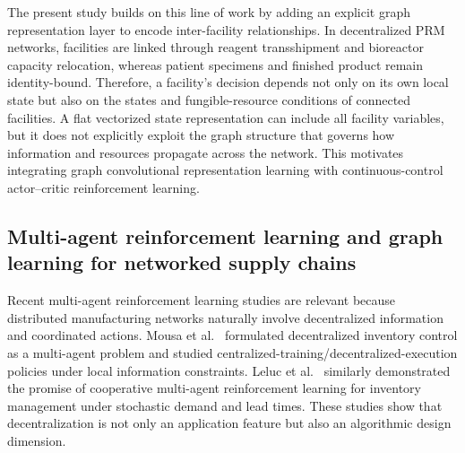 \documentclass[preprint,review,12pt,nonatbib]{elsarticle}
\providecommand{\DIFadd}[1]{{\protect\color{blue}#1}} %
\providecommand{\DIFdel}[1]{} %
\providecommand{\DIFaddbegin}{} %
\providecommand{\DIFaddend}{} %
\providecommand{\DIFdelbegin}{} %
\providecommand{\DIFdelend}{} %
\providecommand{\DIFscaledelfig}{0.5}
\newlength{\DIFdelgraphicswidth} %
\newlength{\DIFdelgraphicsheight} %
\providecommand{\DIFaddincludegraphics}[2][]{{\color{blue}\fbox{\DIFOincludegraphics[#1]{#2}}}} %
\providecommand{\DIFdelincludegraphics}[2][]{%
\sbox{\DIFdelgraphicsbox}{\DIFOincludegraphics[#1]{#2}}%
\settoboxwidth{\DIFdelgraphicswidth}{\DIFdelgraphicsbox} %
\settoboxtotalheight{\DIFdelgraphicsheight}{\DIFdelgraphicsbox} %
\scalebox{\DIFscaledelfig}{%
\parbox[b]{\DIFdelgraphicswidth}{\usebox{\DIFdelgraphicsbox}\\[-\baselineskip] \rule{\DIFdelgraphicswidth}{0em}}\llap{\resizebox{\DIFdelgraphicswidth}{\DIFdelgraphicsheight}{%
\setlength{\unitlength}{\DIFdelgraphicswidth}%
\begin{picture}(1,1)%
\thicklines\linethickness{2pt} %
{\color[rgb]{1,0,0}\put(0,0){\framebox(1,1){}}}%
{\color[rgb]{1,0,0}\put(0,0){\line( 1,1){1}}}%
{\color[rgb]{1,0,0}\put(0,1){\line(1,-1){1}}}%
\end{picture}%
}\hspace*{3pt}}} %
} %
\DeclareRobustCommand{\DIFaddbegin}{\DIFOaddbegin \let\includegraphics\DIFaddincludegraphics} %
\DeclareRobustCommand{\DIFaddend}{\DIFOaddend \let\includegraphics\DIFOincludegraphics} %
\DeclareRobustCommand{\DIFdelbegin}{\DIFOdelbegin \let\includegraphics\DIFdelincludegraphics} %
\DeclareRobustCommand{\DIFdelend}{\DIFOaddend \let\includegraphics\DIFOincludegraphics} %
\begin{document}
The present study builds on this line of work by adding an explicit graph representation layer to encode inter-facility relationships. In decentralized PRM networks, facilities are linked through \DIFdelbegin \DIFdel{possible demand sharing, reagent transshipment , and capacity relocation}\DIFdelend \DIFaddbegin \DIFadd{reagent transshipment and bioreactor capacity relocation, whereas patient specimens and finished product remain identity-bound}\DIFaddend . Therefore, a facility's decision depends not only on its own local state but also on the states and \DIFaddbegin \DIFadd{fungible-}\DIFaddend resource conditions of connected facilities. A flat vectorized state representation can include all facility variables, but it does not explicitly exploit the graph structure that governs how information and resources propagate across the network. This motivates \DIFdelbegin \DIFdel{the integration of }\DIFdelend \DIFaddbegin \DIFadd{integrating }\DIFaddend graph convolutional representation learning with \DIFdelbegin \DIFdel{deep deterministic policy gradient }\DIFdelend \DIFaddbegin \DIFadd{continuous-control actor--critic reinforcement }\DIFaddend learning.

\subsection{Multi-agent reinforcement learning and graph learning for networked supply chains}
Recent multi-agent reinforcement learning studies are relevant because distributed manufacturing networks naturally involve decentralized information and coordinated actions. Mousa et al.~\cite{Mousa2023DecInvMARL} formulated decentralized inventory control as a multi-agent problem and studied centralized-training/decentralized-execution policies under local information constraints. Leluc et al.~\cite{Leluc2023MARLIM} similarly demonstrated the promise of cooperative multi-agent reinforcement learning for inventory management under stochastic demand and lead times. These studies show that decentralization is not only an application feature but also an algorithmic design dimension.
\end{document}

